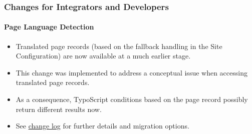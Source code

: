 %

\begin{frame}[fragile]
	\frametitle{Changes for Integrators and Developers}
	\framesubtitle{Page Language Detection}


	\begin{itemize}
		\item Translated page records (based on the fallback handling in the Site
			Configuration) are now available at a much earlier stage.
		\item This change was implemented to address a conceptual issue when
			accessing translated page records.
		\item As a consequence, TypoScript conditions based on the page record
			possibly return different results now.
		\item See \href{https://docs.typo3.org/c/typo3/cms-core/master/en-us/Changelog/11.0/Breaking-23736-PageLanguageDetectionSetEarlierInFrontendRequestProcess.html}{change log}
			for further details and migration options.
	\end{itemize}

\end{frame}

